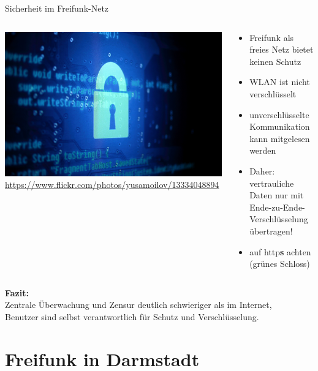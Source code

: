 \documentclass[10pt]{beamer}
\begin{document}
    \begin{frame}{Sicherheit im Freifunk-Netz}
      \begin{columns}[c]
        \begin{column}{5cm}
          \includegraphics[width=\textwidth]{images/lock}
          \newline \tiny \url{https://www.flickr.com/photos/yusamoilov/13334048894}
        \end{column}
        \begin{column}{7cm}
          \begin{itemize}
            \item Freifunk als freies Netz bietet keinen Schutz
            \item WLAN ist nicht verschlüsselt
            \item unverschlüsselte Kommunikation kann mitgelesen werden
            \pause
            \item Daher: vertrauliche Daten nur mit Ende-zu-Ende-Verschlüsselung übertragen!
            \item auf http\textbf{s} achten (grünes Schloss)
          \end{itemize}
        \end{column}
      \end{columns}
      \vfill
      \pause
      \textbf{Fazit:}\\Zentrale Überwachung und Zensur deutlich schwieriger als im Internet, \\
      Benutzer sind selbst verantwortlich für Schutz und Verschlüsselung.
    \end{frame}


  \section{Freifunk in Darmstadt}
\end{document}
